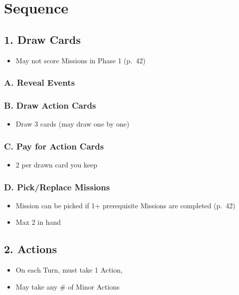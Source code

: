 \documentclass[10pt]{article}
\begin{document}
\addfooter

\section*{Sequence }
\subsection*{1. Draw Cards}
\begin{itemize}
	\item May not score Missions in Phase 1 (p.~42)
\end{itemize}
\subsubsection*{A. Reveal Events}
\subsubsection*{B. Draw Action Cards}

\begin{itemize}
	\item Draw 3 cards (may draw one by one)
\end{itemize}

\subsubsection*{C. Pay for Action Cards}
\begin{itemize}
	\item 2 \ducats per drawn card you keep
\end{itemize}

\subsubsection*{D. Pick/Replace Missions}
\begin{itemize}
	\item Mission can be picked if 1+ prerequisite Missions are completed (p.~42)
	\item Max 2 in hand
\end{itemize}

\subsection*{2. Actions}
\begin{itemize}
	\item On each Turn, must take 1 Action, 
	\item May take any \# of Minor Actions
\end{itemize}
\end{document}
